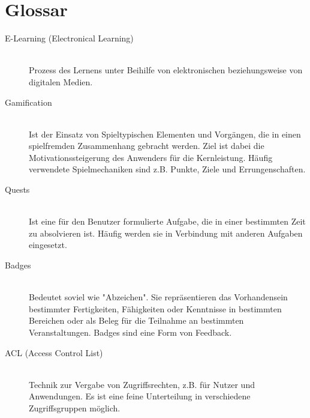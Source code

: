 \documentclass[11pt,a4paper]{scrreprt}
\begin{document}
\chapter{Glossar}
\begin{description}
\item[E-Learning (Electronical Learning)]\ \\
Prozess des Lernens unter Beihilfe von elektronischen beziehungsweise von digitalen Medien.
\item[Gamification]\ \\
Ist der Einsatz von Spieltypischen Elementen und Vorgängen, die in einen spielfremden Zusammenhang gebracht werden. Ziel ist dabei die Motivationssteigerung des Anwenders für die Kernleistung. Häufig verwendete Spielmechaniken sind z.B. Punkte, Ziele und Errungenschaften.

\item[Quests]\ \\
Ist eine für den Benutzer formulierte Aufgabe, die in einer bestimmten Zeit zu absolvieren ist. Häufig werden sie in Verbindung mit anderen Aufgaben eingesetzt.

\item[Badges] \ \\
Bedeutet soviel wie "Abzeichen". Sie repräsentieren das Vorhandensein bestimmter Fertigkeiten, Fähigkeiten oder Kenntnisse in bestimmten Bereichen oder als Beleg für die Teilnahme an bestimmten Veranstaltungen. Badges sind eine Form von Feedback.
\item[ACL (Access Control List)]\ \\
Technik zur Vergabe von Zugriffsrechten, z.B. für Nutzer und Anwendungen. Es ist eine feine Unterteilung in verschiedene Zugriffsgruppen möglich.
\end{description}
\end{document}

